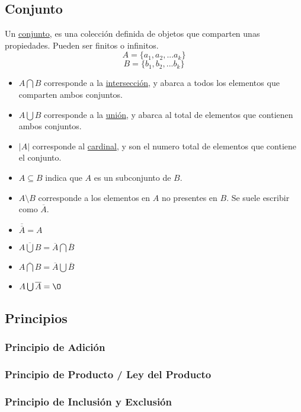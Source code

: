 \subsection{Conjunto}
\noindent Un \underline{conjunto}, es una colección definida de objetos que comparten unas propiedades. Pueden ser finitos o infinitos.
\[
        A = \{a_1,a_2,... a_k\}
\]
\[
        B = \{b_1,b_2,... b_k\}
\]
\noindent{} \par
\begin{itemize}
        \item \(A\bigcap B\) corresponde a la \underline{intersección}, y abarca a todos los elementos que comparten ambos conjuntos.
        \item \(A\bigcup B\) corresponde a la \underline{unión}, y abarca al total de elementos que contienen ambos conjuntos.
        \item \(\left | A \right |\) corresponde al \underline{cardinal}, y son el numero total de elementos que contiene el conjunto.
        \item \(A \subseteq  B\) indica que \(A\) es un subconjunto de \(B\).
        \item \(A\setminus B\) corresponde a los elementos en \(A\) no presentes en \(B\). Se suele escribir como \(\overline{A}\).
        \item \(\overline{\overline{A}} = A\)
        \item \(\overline{A\bigcup B} = \overline{A}\bigcap \overline{B}\)
        \item \(\overline{A\bigcap B} = \overline{A}\bigcup  \overline{B}\)
        \item \(A \bigcup \overline{A} = \O\)
\end{itemize}
\subsection{Principios}
\subsubsection{Principio de Adición}
\subsubsection{Principio de Producto / Ley del Producto}
\subsubsection{Principio de Inclusión y Exclusión}
